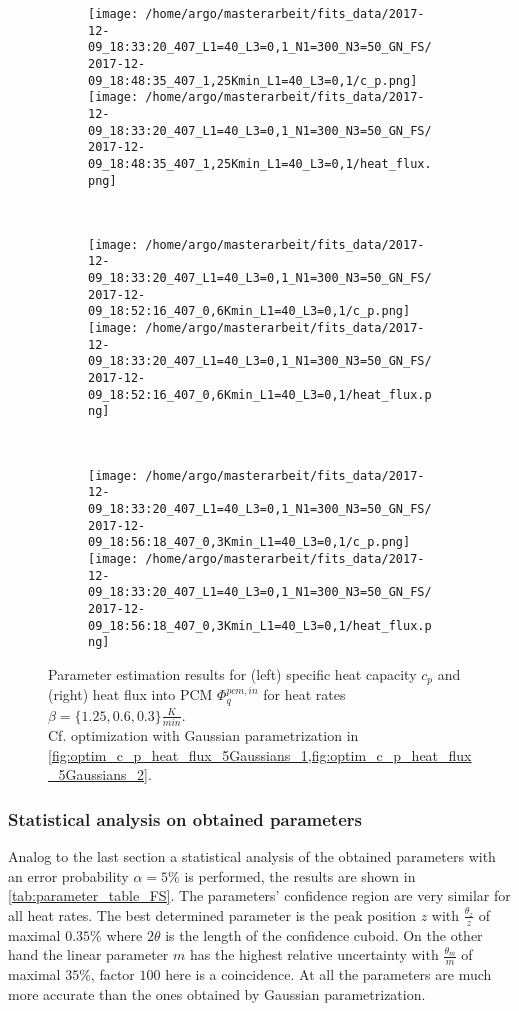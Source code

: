 \documentclass{scrartcl}[12pt, halfparskip]
\numberwithin{equation}{section}
\numberwithin{figure}{section}
\numberwithin{table}{section}
\begin{document}
\begin{figure}[H]
	\begin{subfigure}{1.\textwidth}
		\texttt{[image: /home/argo/masterarbeit/fits\_data/2017-12-09\_18:33:20\_407\_L1=40\_L3=0,1\_N1=300\_N3=50\_GN\_FS/2017-12-09\_18:48:35\_407\_1,25Kmin\_L1=40\_L3=0,1/c\_p.png]}
		\texttt{[image: /home/argo/masterarbeit/fits\_data/2017-12-09\_18:33:20\_407\_L1=40\_L3=0,1\_N1=300\_N3=50\_GN\_FS/2017-12-09\_18:48:35\_407\_1,25Kmin\_L1=40\_L3=0,1/heat\_flux.png]}
	\end{subfigure} \\[1ex]
	
	\begin{subfigure}{1.\textwidth}
		\texttt{[image: /home/argo/masterarbeit/fits\_data/2017-12-09\_18:33:20\_407\_L1=40\_L3=0,1\_N1=300\_N3=50\_GN\_FS/2017-12-09\_18:52:16\_407\_0,6Kmin\_L1=40\_L3=0,1/c\_p.png]}
		\texttt{[image: /home/argo/masterarbeit/fits\_data/2017-12-09\_18:33:20\_407\_L1=40\_L3=0,1\_N1=300\_N3=50\_GN\_FS/2017-12-09\_18:52:16\_407\_0,6Kmin\_L1=40\_L3=0,1/heat\_flux.png]}
	\end{subfigure} \\[1ex]
	
	\begin{subfigure}{1.\textwidth}
		\texttt{[image: /home/argo/masterarbeit/fits\_data/2017-12-09\_18:33:20\_407\_L1=40\_L3=0,1\_N1=300\_N3=50\_GN\_FS/2017-12-09\_18:56:18\_407\_0,3Kmin\_L1=40\_L3=0,1/c\_p.png]}
		\texttt{[image: /home/argo/masterarbeit/fits\_data/2017-12-09\_18:33:20\_407\_L1=40\_L3=0,1\_N1=300\_N3=50\_GN\_FS/2017-12-09\_18:56:18\_407\_0,3Kmin\_L1=40\_L3=0,1/heat\_flux.png]}
	\end{subfigure}
	\caption{Parameter estimation results for (left) specific heat capacity $c_p$ and (right) heat flux into PCM $\varPhi_q^{pcm,in}$ for heat rates $\beta=\{ 1.25, 0.6, 0.3 \} \frac{K}{min}$. \\
	Cf. optimization with Gaussian parametrization in \cref{fig:optim_c_p_heat_flux_5Gaussians_1,fig:optim_c_p_heat_flux_5Gaussians_2}.}
	\label{fig:optim_c_p_heat_flux_FS_2}
\end{figure}

\subsubsection{Statistical analysis on obtained parameters}

Analog to the last section a statistical analysis of the obtained parameters with an error probability $\alpha = 5\%$ is performed, the results are shown in \cref{tab:parameter_table_FS}. The parameters' confidence region are very similar for all heat rates. The best determined parameter is the peak position $z$ with $\frac{\theta_z}{z}$ of maximal $0.35\%$ where $2 \theta$ is the length of the confidence cuboid. On the other hand the linear parameter $m$ has the highest relative uncertainty with $\frac{\theta_m}{m}$ of maximal $35\%$, factor $100$ here is a 	coincidence. At all the parameters are much more accurate than the ones obtained by Gaussian parametrization. 
\end{document}
